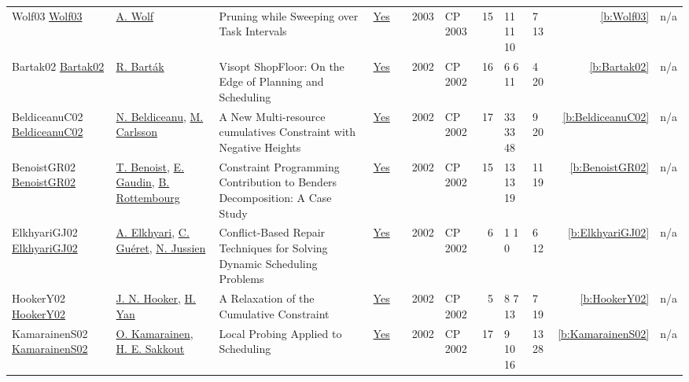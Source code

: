{\begin{longtable}{>{\raggedright\arraybackslash}p{3cm}>{\raggedright\arraybackslash}p{4.5cm}>{\raggedright\arraybackslash}p{6.0cm}rrrp{2.5cm}rp{1cm}p{1cm}rr}
Wolf03 \href{https://doi.org/10.1007/978-3-540-45193-8_50}{Wolf03} & \hyperref[auth:a51]{A. Wolf} & Pruning while Sweeping over Task Intervals & \href{../works/Wolf03.pdf}{Yes} & \cite{Wolf03} & 2003 & CP 2003 & 15 & 11 11 10 & 7 13 & \ref{b:Wolf03} & n/a\\
Bartak02 \href{https://doi.org/10.1007/3-540-46135-3_39}{Bartak02} & \hyperref[auth:a152]{R. Bart{\'{a}}k} & \cellcolor{green!10}Visopt ShopFloor: On the Edge of Planning and Scheduling & \href{../works/Bartak02.pdf}{Yes} & \cite{Bartak02} & 2002 & CP 2002 & 16 & 6 6 11 & 4 20 & \ref{b:Bartak02} & n/a\\
BeldiceanuC02 \href{https://doi.org/10.1007/3-540-46135-3_5}{BeldiceanuC02} & \hyperref[auth:a128]{N. Beldiceanu}, \hyperref[auth:a91]{M. Carlsson} & \cellcolor{green!10}A New Multi-resource cumulatives Constraint with Negative Heights & \href{../works/BeldiceanuC02.pdf}{Yes} & \cite{BeldiceanuC02} & 2002 & CP 2002 & 17 & 33 33 48 & 9 20 & \ref{b:BeldiceanuC02} & n/a\\
BenoistGR02 \href{https://doi.org/10.1007/3-540-46135-3_40}{BenoistGR02} & \hyperref[auth:a1164]{T. Benoist}, \hyperref[auth:a1165]{E. Gaudin}, \hyperref[auth:a1166]{B. Rottembourg} & Constraint Programming Contribution to Benders Decomposition: {A} Case Study & \href{../works/BenoistGR02.pdf}{Yes} & \cite{BenoistGR02} & 2002 & CP 2002 & 15 & 13 13 19 & 11 19 & \ref{b:BenoistGR02} & n/a\\
ElkhyariGJ02 \href{https://doi.org/10.1007/3-540-46135-3_49}{ElkhyariGJ02} & \hyperref[auth:a292]{A. Elkhyari}, \hyperref[auth:a293]{C. Gu{\'{e}}ret}, \hyperref[auth:a247]{N. Jussien} & Conflict-Based Repair Techniques for Solving Dynamic Scheduling Problems & \href{../works/ElkhyariGJ02.pdf}{Yes} & \cite{ElkhyariGJ02} & 2002 & CP 2002 & 6 & 1 1 0 & 6 12 & \ref{b:ElkhyariGJ02} & n/a\\
HookerY02 \href{https://doi.org/10.1007/3-540-46135-3_46}{HookerY02} & \hyperref[auth:a160]{J. N. Hooker}, \hyperref[auth:a291]{H. Yan} & A Relaxation of the Cumulative Constraint & \href{../works/HookerY02.pdf}{Yes} & \cite{HookerY02} & 2002 & CP 2002 & 5 & 8 7 13 & 7 19 & \ref{b:HookerY02} & n/a\\
KamarainenS02 \href{https://doi.org/10.1007/3-540-46135-3_11}{KamarainenS02} & \hyperref[auth:a290]{O. Kamarainen}, \hyperref[auth:a166]{H. E. Sakkout} & Local Probing Applied to Scheduling & \href{../works/KamarainenS02.pdf}{Yes} & \cite{KamarainenS02} & 2002 & CP 2002 & 17 & 9 10 16 & 13 28 & \ref{b:KamarainenS02} & n/a\\

\end{longtable}}
